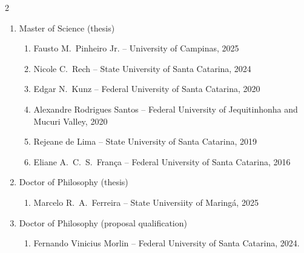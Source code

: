 \documentclass[10pt,A4,english]{article}
\begin{document}
\begin{paracol}{2}
\begin{rightcolumn}
\begin{enumerate}
	\item Master of Science (thesis)
	\begin{enumerate}
		\item Fausto M.~Pinheiro Jr. -- University of Campinas, 2025
		\item Nicole C.~Rech -- State University of Santa Catarina, 2024
		\item Edgar N.~Kunz -- Federal University of Santa Catarina, 2020
		\item Alexandre Rodrigues Santos -- Federal University of Jequitinhonha and Mucuri Valley, 2020
		\item Rejeane de Lima -- State University of Santa Catarina, 2019
		\item Eliane A.~C.~S.~França -- Federal University of Santa Catarina, 2016
	\end{enumerate}
	\item Doctor of Philosophy (thesis)
	\begin{enumerate}
		\item Marcelo R.~A.~Ferreira -- State Universiity of Maringá, 2025
	\end{enumerate}
	\item Doctor of Philosophy (proposal qualification)
	\begin{enumerate}
		\item Fernando Vinicius Morlin -- Federal University of Santa Catarina, 2024.
	\end{enumerate}
\end{enumerate}




\end{rightcolumn}
\end{paracol}
\end{document}
